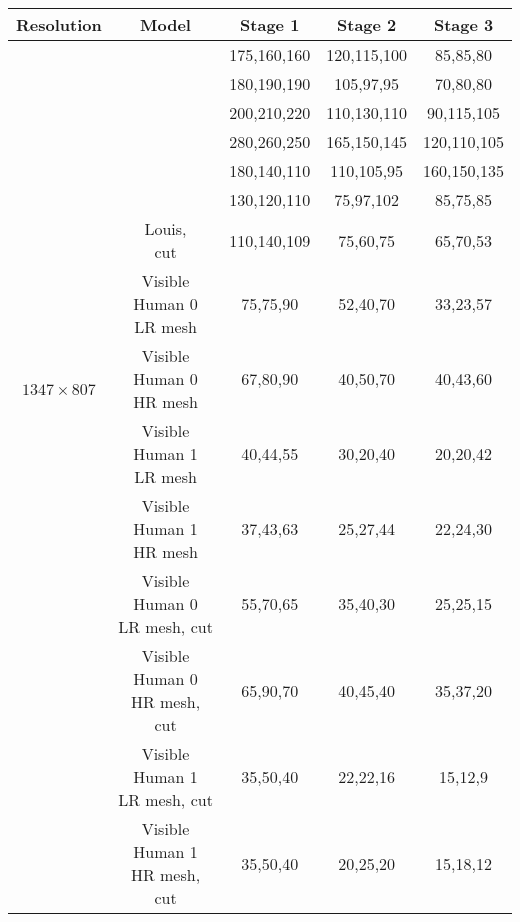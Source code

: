 \begin{tabular}{|c|c||c|c|c|}
	\hline
	Resolution & Model & Stage 1 & Stage 2 & Stage 3 \\
	\hline
	\hline
	\multirow{13}{*}[-7em]{$1347\times807$}& \shortstack{Thelonious} & 175,160,160 & 120,115,100 & 85,85,80 \\\cline{2-5}
	                                & \shortstack{Dizzy} & 180,190,190 & 105,97,95 & 70,80,80 \\\cline{2-5}
	                                & \shortstack{Roberta} & 200,210,220 & 110,130,110 & 90,115,105 \\\cline{2-5}
	                                & \shortstack{Eartha} & 280,260,250 & 165,150,145 & 120,110,105 \\\cline{2-5}
					& \shortstack{Louis} & 180,140,110 & 110,105,95 & 160,150,135 \\\cline{2-5}
	                                & \shortstack{Louis} & 130,120,110 & 75,97,102 & 85,75,85 \\\cline{2-5}
	                                & \shortstack{Louis,\\cut} & 110,140,109 & 75,60,75 & 65,70,53 \\\cline{2-5}
	                                & \shortstack{Visible\\Human 0\\LR mesh} & 75,75,90 & 52,40,70 & 33,23,57 \\\cline{2-5}
	                                & \shortstack{Visible\\Human 0\\HR mesh} & 67,80,90 & 40,50,70 & 40,43,60 \\\cline{2-5}
	                                & \shortstack{Visible\\Human 1\\LR mesh} & 40,44,55 & 30,20,40 & 20,20,42 \\\cline{2-5}
	                                & \shortstack{Visible\\Human 1\\HR mesh} & 37,43,63 & 25,27,44 & 22,24,30 \\\cline{2-5}
	                                & \shortstack{Visible\\Human 0\\LR mesh, cut} & 55,70,65 & 35,40,30 & 25,25,15 \\\cline{2-5}
	                                & \shortstack{Visible\\Human 0\\HR mesh, cut} & 65,90,70 & 40,45,40 & 35,37,20 \\\cline{2-5}
					& \shortstack{Visible\\Human 1\\LR mesh, cut} & 35,50,40 & 22,22,16 & 15,12,9 \\\cline{2-5}
					& \shortstack{Visible\\Human 1\\HR mesh, cut} & 35,50,40 & 20,25,20 & 15,18,12 \\\cline{2-5}
	\hline
\end{tabular}
